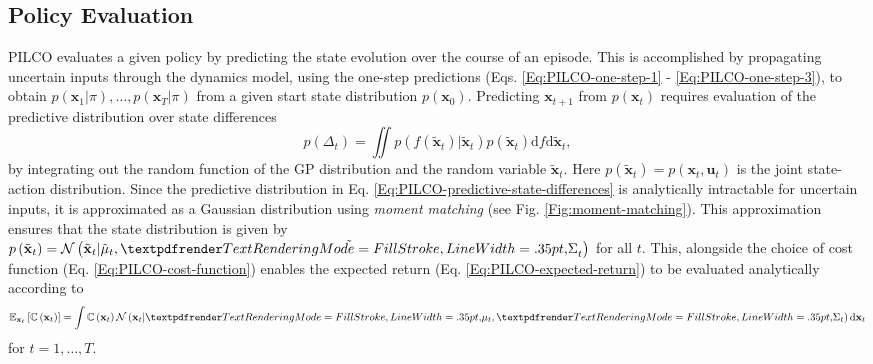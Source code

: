 \subsection{Policy Evaluation}
\label{PILCO:policy-evaluation}
PILCO evaluates a given policy by predicting the state evolution over the course of an episode. This is accomplished by propagating uncertain inputs through the dynamics model, using the one-step predictions (Eqs. \ref{Eq:PILCO-one-step-1} - \ref{Eq:PILCO-one-step-3}), to obtain $p\left(\mathbf{x}_{1} | \pi\right), \ldots, p\left(\mathbf{x}_{T} | \pi\right)$ from a given start state distribution $p\left(\mathbf{x}_{0}\right)$. Predicting $\mathbf{x}_{t+1}$ from $p(\mathbf{x}_{t})$ requires evaluation of the predictive distribution over state differences
\begin{equation}
    p\left(\Delta_{t}\right)=\iint p\left(f\left(\tilde{\mathbf{x}}_{t}\right) | \tilde{\mathbf{x}}_{t}\right) p\left(\tilde{\mathbf{x}}_{t}\right) \mathrm{d} f \mathrm{d} \tilde{\mathbf{x}}_{t},
    \label{Eq:PILCO-predictive-state-differences}
\end{equation}
by integrating out the random function of the GP distribution and the random variable $\tilde{\mathbf{x}}_{t}$. Here $p\left(\tilde{\mathbf{x}}_{t}\right)=p\left(\mathbf{x}_{t}, \mathbf{u}_{t}\right)$ is the joint state-action distribution. Since the predictive distribution in Eq. \ref{Eq:PILCO-predictive-state-differences} is analytically intractable for uncertain inputs, it is approximated as a Gaussian distribution using \textit{moment matching} (see Fig. \ref{Fig:moment-matching}). This approximation ensures that the state distribution is given by $p\left(\tilde{\mathbf{x}}_{t}\right)=\mathcal{N}\left(\tilde{\mathbf{x}}_{t} | \tilde{\mathbf{\mu}}_{t}, \tilde{\boldgreek{\Sigma}}_{t}\right)$ for all $t$. This, alongside the choice of cost function (Eq. \ref{Eq:PILCO-cost-function}) enables the expected return (Eq. \ref{Eq:PILCO-expected-return}) to be evaluated analytically according to
\begin{equation}
    \mathbb{E}_{\mathbf{x}_{t}}\left[\mathbb{C}\left(\mathbf{x}_{t}\right)\right]=\int \mathbb{C}\left(\mathbf{x}_{t}\right) \mathcal{N}\left(\mathbf{x}_{t} | \boldgreek{\mu}_{t}, \boldgreek{\Sigma}_{t}\right) \mathrm{d} \mathbf{x}_{t}
\end{equation}
for $t=1,\dots,T$.

